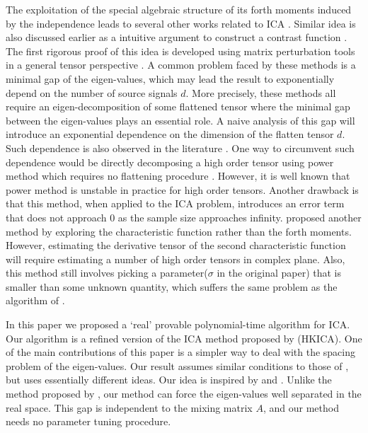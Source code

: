 \documentclass[twoside]{article}
\theoremstyle{definition}
\begin{document}
The exploitation of the special algebraic structure of its forth moments induced by the independence leads to several other works related to ICA \citep{hsu2013learning,anandkumar2012tensordecomposition,anandkumar2012method}. 
Similar idea is also discussed earlier as a intuitive argument to construct a contrast function \citep{cardoso1999high}. 
The first rigorous proof of this idea is developed using matrix perturbation tools in a general tensor perspective \citep{anandkumar2012tensordecomposition,anandkumar2012method,goyal2014fourier}. 
A common problem faced by these methods is a minimal gap of the eigen-values, which may lead the result to exponentially depend on the number of source signals $d$.
More precisely, these methods all require an eigen-decomposition of some flattened tensor where the minimal gap between the eigen-values plays an essential role. 
A naive analysis of this gap will introduce an exponential dependence on the dimension of the flatten tensor $d$. 
Such dependence is also observed in the literature \citep{cardoso1999high,goyal2014fourier}.
One way to circumvent such dependence would be directly decomposing a high order tensor using power method which requires no flattening procedure \citep{anandkumar2014guaranteed}. 
However, it is well known that power method is unstable in practice for high order tensors. 
Another drawback is that this method, when applied to the ICA problem, introduces an error term that does not approach 0 as the sample size approaches infinity. 
\citet{goyal2014fourier} proposed another method by exploring the  characteristic function rather than the forth moments. 
However, estimating the derivative tensor of the second characteristic function will require estimating a number of high order tensors in complex plane. 
Also, this method still involves picking a parameter($\sigma$ in the original paper) that is smaller than some unknown quantity, which suffers the same problem as the algorithm of \citet{arora2012provable}.

In this paper we proposed a `real' provable polynomial-time algorithm for ICA.
Our algorithm is a refined version of the ICA method proposed by \cite{hsu2013learning} (HKICA). 
One of the main contributions of this paper is a simpler way to deal with the spacing problem of the eigen-values. 
Our result assumes similar conditions to those of \citet{goyal2014fourier}, but uses essentially different ideas.
Our idea is inspired by \citet{frieze1996learning} and \citet{arora2012provable}.
Unlike the method proposed by \citet{goyal2014fourier}, our method can force the eigen-values well separated in the real space. 
This gap is independent to the mixing matrix $A$, and our method needs no parameter tuning procedure.  
\end{document}
